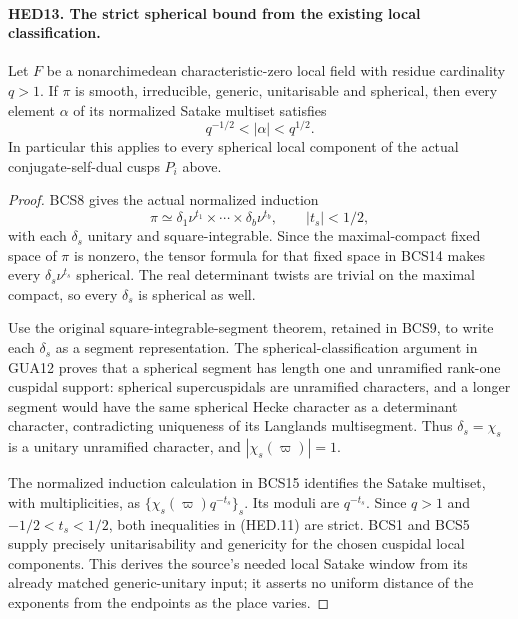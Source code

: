 \documentclass[11pt,a4paper]{article}
\numberwithin{equation}{section}
\theoremstyle{remark}\newtheorem{remark}[theorem]{Remark}
\begin{document}
\paragraph{HED13. The strict spherical bound from the existing local classification.}
\label{claim:HED13}
Let \(F\) be a nonarchimedean characteristic-zero local field with
residue cardinality \(q>1\).  If \(\pi\) is smooth, irreducible,
generic, unitarisable and spherical, then every element \(\alpha\)
of its normalized Satake multiset satisfies
\[
                         q^{-1/2}<|\alpha|<q^{1/2}.
 \tag{HED.11}
\]
In particular this applies to every spherical local component of
the actual conjugate-self-dual cusps \(P_i\) above.
\begin{proof}
BCS8 gives the actual normalized induction
\[
          \pi\simeq\delta_1\nu^{t_1}\times\cdots\times
                             \delta_b\nu^{t_b},\qquad |t_s|<1/2,
\]
with each \(\delta_s\) unitary and square-integrable.  Since the
maximal-compact fixed space of \(\pi\) is nonzero, the tensor
formula for that fixed space in BCS14 makes every
\(\delta_s\nu^{t_s}\) spherical.  The real determinant twists
are trivial on the maximal compact, so every \(\delta_s\) is
spherical as well.

Use the original square-integrable-segment theorem, retained in
BCS9, to write each \(\delta_s\) as a segment representation.
The spherical-classification argument in GUA12 proves that a
spherical segment has length one and unramified rank-one cuspidal
support: spherical supercuspidals are unramified characters, and
a longer segment would have the same spherical Hecke character
as a determinant character, contradicting uniqueness of its
Langlands multisegment.  Thus \(\delta_s=\chi_s\) is a unitary
unramified character, and \(|\chi_s(\varpi)|=1\).

The normalized induction calculation in BCS15 identifies the
Satake multiset, with multiplicities, as
\(\{\chi_s(\varpi)q^{-t_s}\}_s\).  Its moduli are \(q^{-t_s}\).
Since \(q>1\) and \(-1/2<t_s<1/2\), both inequalities in
(HED.11) are strict.  BCS1 and BCS5 supply precisely unitarisability
and genericity for the chosen cuspidal local components.
This derives the source's needed local Satake window from its
already matched generic-unitary input; it asserts no uniform
distance of the exponents from the endpoints as the place varies.
\end{proof}

\end{document}
